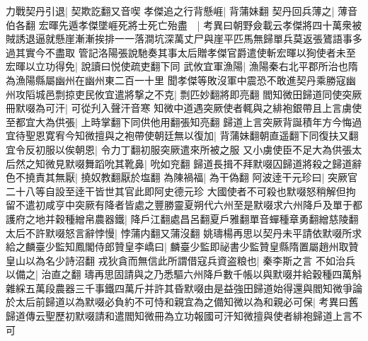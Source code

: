 力戰契丹引退|{
	契欺訖翻又音喫}
孝傑追之行背懸崕|{
	背蒲妹翻}
契丹回兵薄之|{
	薄音伯各翻}
宏暉先遁孝傑墜崕死將士死亡殆盡　|{
	考異曰朝野僉載云孝傑將四十萬衆被賊誘退逼就懸崖漸漸挨排一一落澗坑深萬丈尸與崖平匹馬無歸單兵莫返張鷟語事多過其實今不盡取}
管記洛陽張說馳奏其事太后贈孝傑官爵遣使斬宏暉以狥使者未至宏暉以立功得免|{
	說讀曰悦使疏吏翻下同}
武攸宜軍漁陽|{
	漁陽秦右北平郡所治也隋為漁陽縣屬幽州在幽州東二百一十里}
聞孝傑等敗沒軍中震恐不敢進契丹乘勝寇幽州攻䧟城邑剽掠吏民攸宜遣將撃之不克|{
	剽匹妙翻將即亮翻}
閻知微田歸道同使突厥冊默啜為可汗|{
	可從刋入聲汗音寒}
知微中道遇突厥使者輒與之緋袍銀帶且上言虜使至都宜大為供張|{
	上時掌翻下同供他用翻張知亮翻}
歸道上言突厥背誕積年方今悔過宜待聖恩寛宥今知微擅與之袍帶使朝廷無以復加|{
	背蒲妹翻朝直遥翻下同復扶又翻}
宜令反初服以俟朝恩|{
	令力丁翻初服突厥遣來所被之服}
又小虜使臣不足大為供張太后然之知微見默啜舞蹈吮其靴鼻|{
	吮如兖翻}
歸道長揖不拜默啜囚歸道將殺之歸道辭色不撓責其無厭|{
	撓奴教翻厭於塩翻}
為陳禍福|{
	為干偽翻}
阿波逹干元珍曰|{
	突厥官二十八等自設至逹干皆世其官此即阿史德元珍}
大國使者不可殺也默啜怒稍解但拘留不遣初咸亨中突厥有降者皆處之豐勝靈夏朔代六州至是默啜求六州降戶及單于都護府之地并穀種繒帛農器鐵|{
	降戶江翻處昌呂翻夏戶雅翻單音蟬種章勇翻繒慈陵翻}
太后不許默啜怒言辭悖慢|{
	悖蒲内翻又蒲沒翻}
姚璹楊再思以契丹未平請依默啜所求給之麟臺少監知鳳閣侍郎贊皇李嶠曰|{
	麟臺少監即祕書少監贊皇縣隋置屬趙州取贊皇山以為名少詩沼翻}
戎狄貪而無信此所謂借寇兵資盗粮也|{
	秦李斯之言}
不如治兵以備之|{
	治直之翻}
璹再思固請與之乃悉驅六州降戶數千帳以與默啜并給穀種四萬斛雜綵五萬段農器三千事鐵四萬斤并許其昏默啜由是益強田歸道始得還與閻知微爭論於太后前歸道以為默啜必負約不可恃和親宜為之備知微以為和親必可保|{
	考異曰舊歸道傳云聖歷初默啜請和遣閻知微冊為立功報國可汗知微擅與使者緋袍歸道上言不可}


